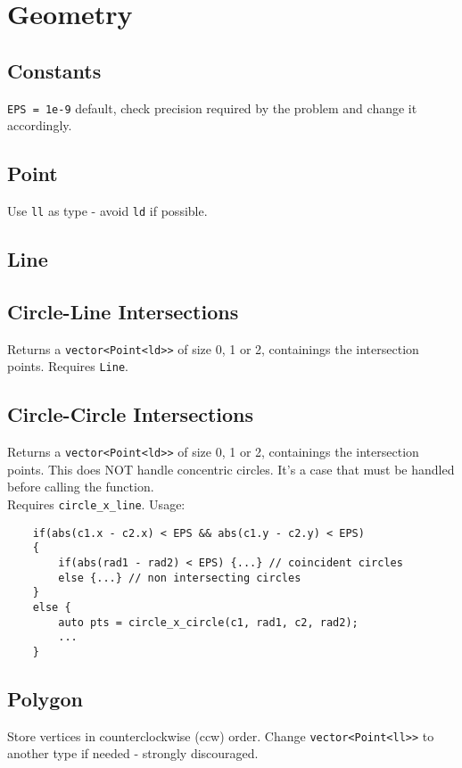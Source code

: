 \section{Geometry}

\subsection{Constants}
\verb|EPS = 1e-9| default, check precision required by the problem and
change it accordingly.


\subsection{Point}
Use \verb|ll| as type - avoid \verb|ld| if possible.

\subsection{Line}

\subsection{Circle-Line Intersections}
Returns a \verb|vector<Point<ld>>| of size 0, 1 or 2, containings the intersection points.
Requires \verb|Line|.


\subsection{Circle-Circle Intersections}
Returns a \verb|vector<Point<ld>>| of size 0, 1 or 2, containings the intersection points.
This does NOT handle concentric circles. It's a case that must be handled before calling the function.\\
Requires \verb|circle_x_line|. Usage:
\begin{lstlisting}
	if(abs(c1.x - c2.x) < EPS && abs(c1.y - c2.y) < EPS)
	{
		if(abs(rad1 - rad2) < EPS) {...} // coincident circles
		else {...} // non intersecting circles
	}
	else {
		auto pts = circle_x_circle(c1, rad1, c2, rad2);
		...
	}
\end{lstlisting}


\subsection{Polygon}
Store vertices in counterclockwise (ccw) order.
Change \verb|vector<Point<ll>>| to another type if needed - strongly discouraged.

